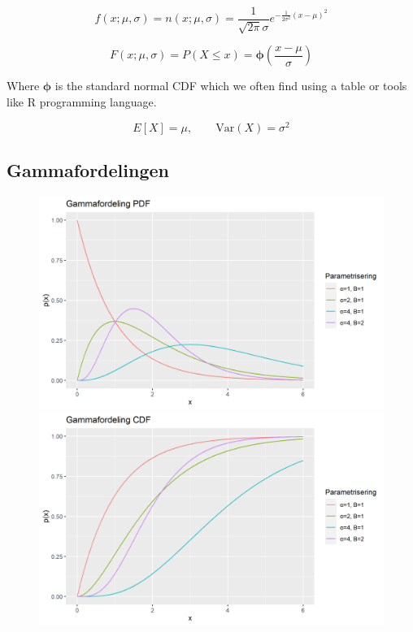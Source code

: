 \begin{equation}
    f(x; \mu, \sigma) = n(x; \mu, \sigma) = \frac{1}{\sqrt{2\pi}\sigma} e^{-\frac{1}{2\sigma^2}(x-\mu)^2}
\end{equation}

\begin{equation}
    F(x; \mu, \sigma) = P(X \leq x) = \boldsymbol{\phi}\left(\frac{x - \mu}{\sigma}\right)
\end{equation}

Where $\boldsymbol{\phi}$ is the standard normal CDF which we often find using a table or tools like R programming language.

\begin{equation}
    E[X] = \mu, \qquad \text{Var}(X) = \sigma^2
\end{equation}

\subsection{Gammafordelingen}
\begin{figure}[H]
  \centering
  \begin{minipage}[b]{0.49\textwidth}
\includegraphics[width=\textwidth]{bilete/gammapdf.png}
  \end{minipage}
  \hfill
  \begin{minipage}[b]{0.49\textwidth}
    \includegraphics[width=\textwidth]{bilete/gammacdf.png}
  \end{minipage}
\end{figure}

